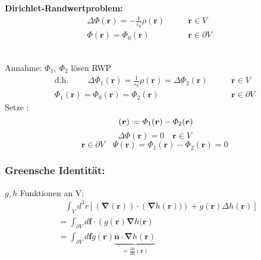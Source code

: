 \documentclass[titlepage,11pt,a4paper,ngerman]{report}
\newcommand*{\defeq}{\mathrel{\vcenter{\baselineskip0.5ex \lineskiplimit0pt \hbox{\scriptsize.}\hbox{\scriptsize.}}}=}
\newcommand{\ub}[1]{\underbrace{#1}}
\newcommand{\pofr}{\Phi(\vec{r})}
\renewcommand{\Phi}{\varPhi}
\renewcommand{\vec}[1]{\boldsymbol{#1}}
\renewcommand{\epsilon}{\varepsilon}
\begin{document}
\begin{minipage}{.6\linewidth}
	\textbf{Dirichlet-Randwertproblem:}
	\begin{align*}
	\Delta \pofr = -\frac{1}{\epsilon_0} \rho(\vec{r}) &\qquad \vec{r} \in V\\
	\pofr = \Phi_0 (\vec{r}) \quad \; &\qquad \vec{r} \in \partial V \quad \;
	\end{align*}
\end{minipage}%
\begin{minipage}{.4\linewidth}
	\centering
\end{minipage}%
\\
Annahme: $\Phi_1,\ \Phi_2$ lösen RWP
\begin{align*}
\textrm{d.h. }\qquad \Delta\Phi_1(\vec{r}) = \frac{1}{\epsilon_0} \rho(\vec{r}) = \Delta \Phi_2 (\vec{r}) &\qquad \vec{r} \in V\\
\Phi_1 (\vec{r}) = \Phi_0(\vec{r}) = \Phi_2(\vec{r}) \quad \ &\qquad \vec{r} \in \partial V
\end{align*}
Setze :
\begin{equation*}
\ (\vec{r}) \defeq \Phi_1(\vec{r}) - \Phi_2(\vec{r})
\end{equation*}
\begin{equation*}
\Delta \Phi(\vec{r}) = 0 \quad \vec{r} \in V 
\end{equation*}
\begin{equation*}
\vec{r} \in \partial V \quad \varPsi(\vec{r}) = \Phi_1(\vec{r}) - \Phi_2(\vec{r}) = 0
\end{equation*}

\subsubsection{Greensche Identität:}
$ g,h $ Funktionen an V:
\begin{align*}
&\ \ \ \, \int_V d^3 r \left[\left(\vec{\nabla} (\vec{r})\right) \cdot \left(\vec{\nabla} h(\vec{r}))\right) + g(\vec{r}) \Delta h(\vec{r})\right]\\
&= \int_{\partial V} d\vec{f} \cdot \left(g(\vec{r}) \vec{\nabla} h(\vec{r}\right)\\
&= \int_{\partial V} d\vec{f} g(\vec{r}) \ub{\vec{n} \cdot \vec{\nabla} h(\vec{r})}_{= \frac{\partial h}{\partial n} (\vec{r})}
\end{align*}
\end{document}
